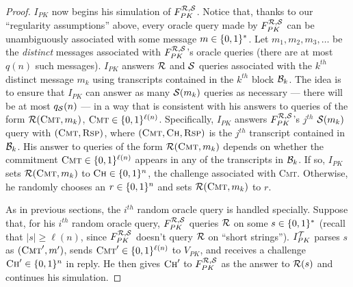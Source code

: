 \begin{proof}
$I_{PK}$ now begins his simulation of $F^{\mathcal{R},\mathcal{S}}_{PK}$. 
Notice that, thanks to our ``regularity assumptions'' above, every
oracle query made by $F^{\mathcal{R},\mathcal{S}}_{PK}$ can be unambiguously associated with
some message $m \in \{0,1\}^{*}$. Let $m_1,m_2,m_3,\ldots$ be the \emph{distinct}
messages associated with $F^{\mathcal{R},\mathcal{S}}_{PK}$'s
oracle queries (there are at most $q(n)$ such messages).
$I_{PK}$ answers $\mathcal{R}$ and $\mathcal{S}$ queries associated with the $k^{th}$
distinct message $m_k$ using transcripts contained in the $k^{th}$ block
$\mathcal{B}_k$. The idea is to ensure that $I_{PK}$ can answer as many $\mathcal{S}(m_k)$
queries as necessary --- there will be at most $q_{\mathcal{S}}(n)$ --- in a way that
is consistent with his answers to queries of the form
$\mathcal{R}(\textsc{Cmt},m_k)$, $\textsc{Cmt} \in \{0,1\}^{\ell(n)}$. Specifically,
$I_{PK}$ answers $F^{\mathcal{R},\mathcal{S}}_{PK}$'s $j^{th}$ 
$\mathcal{S}(m_k)$ query with $(\textsc{Cmt},\textsc{Rsp})$, where
$(\textsc{Cmt},\textsc{Ch},\textsc{Rsp})$ is the $j^{th}$ transcript contained
in $\mathcal{B}_k$. His answer to queries of the form $\mathcal{R}(\textsc{Cmt},m_k)$
depends on whether the commitment $\textsc{Cmt} \in \{0,1\}^{\ell(n)}$ appears in
any of the transcripts in $\mathcal{B}_k$. If so, $I_{PK}$ sets
$\mathcal{R}(\textsc{Cmt},m_k)$ to $\textsc{Ch} \in \{0,1\}^{n}$, the challenge
associated with \textsc{Cmt}. Otherwise, he randomly chooses an $r \in
\{0,1\}^{n}$ and sets $\mathcal{R}(\textsc{Cmt},m_k)$ to $r$. 

As in previous sections, the $i^{th}$ random oracle query is handled
specially. 
Suppose that, for his $i^{th}$ random oracle query, $F_{PK}^{\mathcal{R},\mathcal{S}}$
queries $\mathcal{R}$ on some $s \in \{0,1\}^{*}$ (recall that $|s| \geq \ell(n)$,
since $F^{\mathcal{R},\mathcal{S}}_{PK}$ doesn't query $\mathcal{R}$ on ``short strings'').
$I_{PK}^{\mathcal{T}}$ parses $s$ as $(\textsc{Cmt}',m')$, sends $\textsc{Cmt}' \in
\{0,1\}^{\ell(n)}$ to $V_{PK}$, and receives a challenge $\textsc{Ch}' \in
\{0,1\}^{n}$ in reply.  He then gives $\textsc{Ch}'$ to $F_{PK}^{\mathcal{R},\mathcal{S}}$ as
the answer to $\mathcal{R}(s)$ and continues his simulation.


\end{proof}
